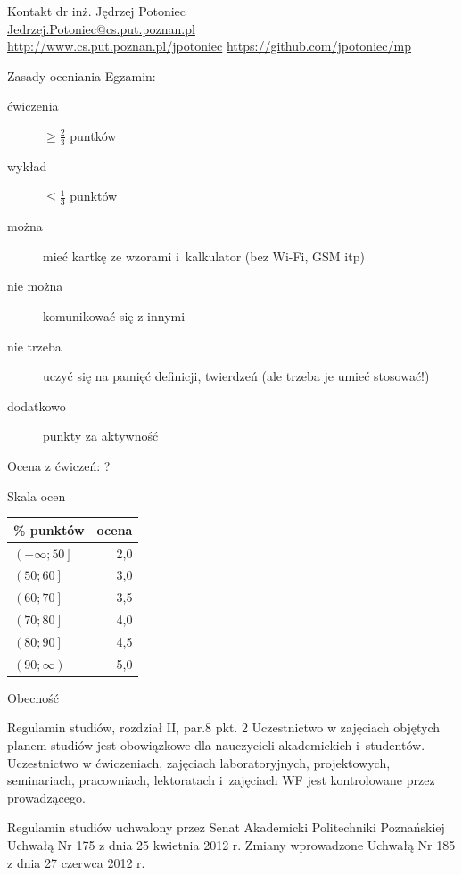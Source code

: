 \documentclass{mp}
\subtitle{Uwagi organizacyjne}
\begin{document}
\begin{frame}
\titlepage
\end{frame}
\begin{frame}{Kontakt}
dr inż. Jędrzej Potoniec \\
\url{Jedrzej.Potoniec@cs.put.poznan.pl}\\
\url{http://www.cs.put.poznan.pl/jpotoniec}
\url{https://github.com/jpotoniec/mp}
\end{frame}
\begin{frame}{Zasady oceniania}
Egzamin:
\begin{description}
	\item[ćwiczenia] $\geq \frac{2}{3}$ puntków
	\item[wykład] $\leq \frac{1}{3}$ punktów
	\item[można] mieć kartkę ze wzorami i~kalkulator (bez Wi-Fi, GSM itp)
	\item[nie można] komunikować się z innymi
	\item[nie trzeba] uczyć się na pamięć definicji, twierdzeń (ale trzeba je umieć stosować!)
	\item[dodatkowo] punkty za aktywność
\end{description}

Ocena z ćwiczeń: \alert{?}
\end{frame}
\begin{frame}{Skala ocen}
\begin{center}
\begin{tabular}{l|r}
\% punktów & ocena \\
\hline
$\left(-\infty; 50\right]$ & 2,0 \\
$\left(50; 60\right]$ & 3,0 \\
$\left(60; 70\right]$ & 3,5 \\
$\left(70; 80\right]$ & 4,0 \\
$\left(80; 90\right]$ & 4,5 \\
$\left(90; \infty\right)$ & 5,0 \\
\end{tabular}
\end{center}
\end{frame}
\begin{frame}{Obecność}
\begin{block}{Regulamin studiów, rozdział II, par.8 pkt. 2}
Uczestnictwo w zajęciach objętych planem studiów jest obowiązkowe dla nauczycieli akademickich i~studentów.
Uczestnictwo w ćwiczeniach, zajęciach laboratoryjnych, projektowych, seminariach, pracowniach, lektoratach i~zajęciach WF jest kontrolowane przez prowadzącego.
\end{block}
{\tiny Regulamin studiów uchwalony przez Senat Akademicki Politechniki Poznańskiej Uchwałą Nr 175 z dnia 25 kwietnia 2012 r. Zmiany wprowadzone Uchwałą Nr 185 z dnia 27 czerwca 2012 r.}
\end{frame}
\end{document}
